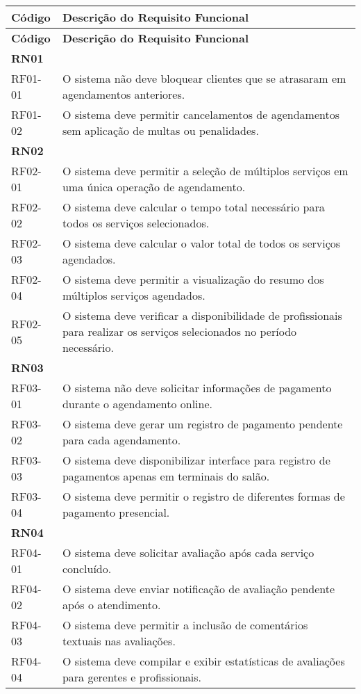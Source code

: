 \begin{longtable}{|p{}|p{}|}
	\hline
	\textbf{Código} & \textbf{Descrição do Requisito Funcional} \\
	\hline
	\endfirsthead
	
	\hline
	\textbf{Código} & \textbf{Descrição do Requisito Funcional} \\
	\hline
	\endhead
	
	\multicolumn{2}{|l|}{\textbf{RN01}} \\ \hline
	RF01-01 & O sistema não deve bloquear clientes que se atrasaram em agendamentos anteriores. \\ \hline
	RF01-02 & O sistema deve permitir cancelamentos de agendamentos sem aplicação de multas ou penalidades. \\ \hline
	
	\multicolumn{2}{|l|}{\textbf{RN02}} \\ \hline
	RF02-01 & O sistema deve permitir a seleção de múltiplos serviços em uma única operação de agendamento. \\ \hline
	RF02-02 & O sistema deve calcular o tempo total necessário para todos os serviços selecionados. \\ \hline
	RF02-03 & O sistema deve calcular o valor total de todos os serviços agendados. \\ \hline
	RF02-04 & O sistema deve permitir a visualização do resumo dos múltiplos serviços agendados. \\ \hline
	RF02-05 & O sistema deve verificar a disponibilidade de profissionais para realizar os serviços selecionados no período necessário. \\ \hline
	
	\multicolumn{2}{|l|}{\textbf{RN03}} \\ \hline
	RF03-01 & O sistema não deve solicitar informações de pagamento durante o agendamento online. \\ \hline
	RF03-02 & O sistema deve gerar um registro de pagamento pendente para cada agendamento. \\ \hline
	RF03-03 & O sistema deve disponibilizar interface para registro de pagamentos apenas em terminais do salão. \\ \hline
	RF03-04 & O sistema deve permitir o registro de diferentes formas de pagamento presencial. \\ \hline
	
	\multicolumn{2}{|l|}{\textbf{RN04}} \\ \hline
	RF04-01 & O sistema deve solicitar avaliação após cada serviço concluído. \\ \hline
	RF04-02 & O sistema deve enviar notificação de avaliação pendente após o atendimento. \\ \hline
	RF04-03 & O sistema deve permitir a inclusão de comentários textuais nas avaliações. \\ \hline
	RF04-04 & O sistema deve compilar e exibir estatísticas de avaliações para gerentes e profissionais. \\ \hline
	

\end{longtable}
